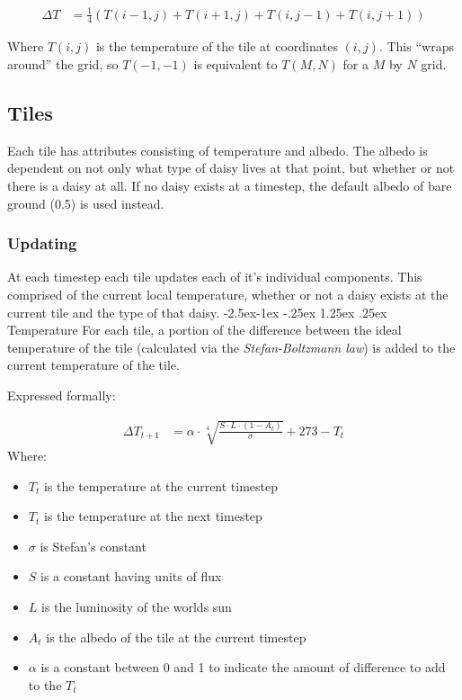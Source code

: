 \documentclass[12pt]{article}
\makeatletter
\renewcommand\paragraph{\@startsection{paragraph}{4}{\z@}%
            {-2.5ex\@plus -1ex \@minus -.25ex}%
            {1.25ex \@plus .25ex}%
            {\normalfont\normalsize\bfseries}}
\makeatother
\begin{document}
\begin{align}
  \Delta T &= \frac{1}{4}\left(T(i-1,j) + T(i+1,j) + T(i,j-1) + T(i,j+1) \right)
\end{align}

Where $T(i,j)$ is the temperature of the tile at coordinates
$(i,j)$. This ``wraps around'' the grid, so $T(-1,-1)$ is equivalent
to $T(M,N)$ for a $M$ by $N$ grid.

\subsection{Tiles} \label{Tiles}
Each tile has attributes consisting of temperature and albedo. The
albedo is dependent on not only what type of daisy lives at that
point, but whether or not there is a daisy at all. If no daisy exists
at a timestep, the default albedo of bare ground (0.5) is used
instead.
\subsubsection{Updating}
At each timestep each tile updates each of it's individual
components. This comprised of the current local temperature, whether
or not a daisy exists at the current tile and the type of that daisy.
\paragraph{Temperature}
For each tile, a portion of the difference between the ideal
temperature of the tile (calculated via the \emph{Stefan-Boltzmann
  law}) is added to the current temperature of the tile.

Expressed formally:

\begin{align}
  \Delta T_{t+1} &= \alpha\cdot \sqrt[4]{\frac{S\cdot L \cdot
      (1-A_t)}{\sigma}} + 273 - T_t
\end{align}
Where:
\begin{itemize}
\item $T_{t}$ is the temperature at the current timestep
\item $T_{t}$ is the temperature at the next timestep
\item $\sigma$ is Stefan's constant
\item $S$ is a constant having units of flux
\item $L$ is the luminosity of the worlds sun
\item $A_t$ is the albedo of the tile at the current timestep
\item $\alpha$ is a constant between 0 and 1 to indicate the amount of
  difference to add to the $T_t$
\end{itemize}
\end{document}
